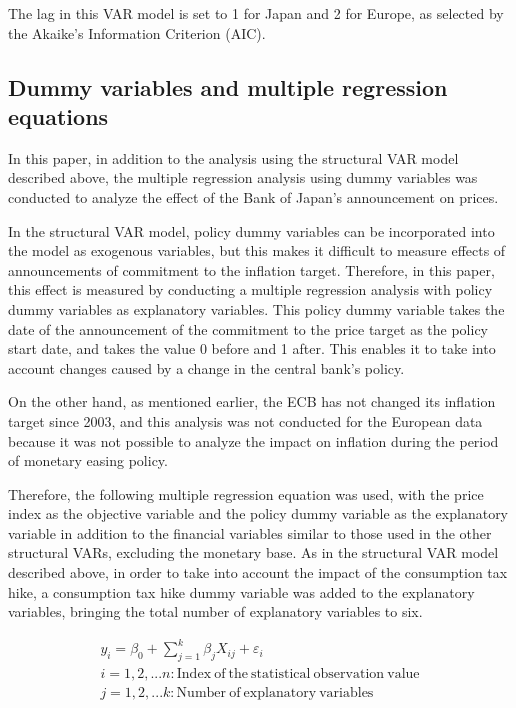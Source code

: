\documentclass[12pt]{article}
\begin{document}
The lag in this VAR model is set to 1 for Japan and 2 for Europe, as selected by the Akaike's Information Criterion (AIC).

\subsection{Dummy variables and multiple regression equations}

In this paper, in addition to the analysis using the structural VAR model described above, the multiple regression analysis using dummy variables was conducted to analyze the effect of the Bank of Japan's announcement on prices.

In the structural VAR model, policy dummy variables can be incorporated into the model as exogenous variables, but this makes it difficult to measure effects of announcements of commitment to the inflation target.
Therefore, in this paper, this effect is measured by conducting a multiple regression analysis with policy dummy variables as explanatory variables.
This policy dummy variable takes the date of the announcement of the commitment to the price target as the policy start date, and takes the value 0 before and 1 after.
This enables it to take into account changes caused by a change in the central bank's policy.

On the other hand, as mentioned earlier, the ECB has not changed its inflation target since 2003, and this analysis was not conducted for the European data because it was not possible to analyze the impact on inflation during the period of monetary easing policy.

Therefore, the following multiple regression equation was used, with the price index as the objective variable and the policy dummy variable as the explanatory variable in addition to the financial variables similar to those used in the other structural VARs, excluding the monetary base.
As in the structural VAR model described above, in order to take into account the impact of the consumption tax hike, a consumption tax hike dummy variable was added to the explanatory variables, bringing the total number of explanatory variables to six.

\begin{equation}
    \label{eq4}
    \begin{gathered}
        y_i = \beta_0 + \sum_{j=1}^k \beta_j X_{ij} + \varepsilon_i \\
        i=1,2,...n : \mathrm{Index \: of \: the \: statistical \: observation \: value}\\
        j=1,2,...k : \mathrm{Number \: of \: explanatory \: variables}\\
    \end{gathered}
\end{equation}
\end{document}
